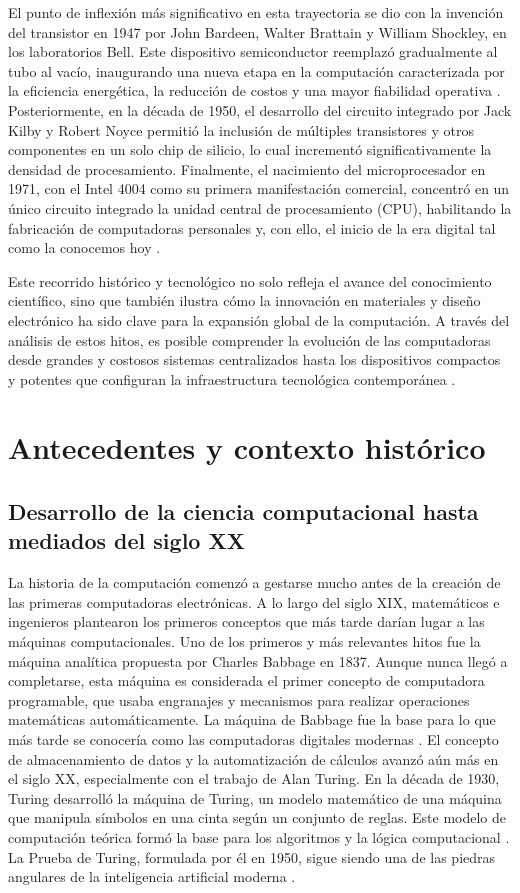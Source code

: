 \documentclass[]{article}
\begin{document}
El punto de inflexión más significativo en esta trayectoria se dio con la invención del transistor en 1947 por John Bardeen, Walter Brattain y William Shockley, en los laboratorios Bell. Este dispositivo semiconductor reemplazó gradualmente al tubo al vacío, inaugurando una nueva etapa en la computación caracterizada por la eficiencia energética, la reducción de costos y una mayor fiabilidad operativa \cite{ceruzzi2003}. Posteriormente, en la década de 1950, el desarrollo del circuito integrado por Jack Kilby y Robert Noyce permitió la inclusión de múltiples transistores y otros componentes en un solo chip de silicio, lo cual incrementó significativamente la densidad de procesamiento. Finalmente, el nacimiento del microprocesador en 1971, con el Intel 4004 como su primera manifestación comercial, concentró en un único circuito integrado la unidad central de procesamiento (CPU), habilitando la fabricación de computadoras personales y, con ello, el inicio de la era digital tal como la conocemos hoy \cite{ceruzzi2003}.

Este recorrido histórico y tecnológico no solo refleja el avance del conocimiento científico, sino que también ilustra cómo la innovación en materiales y diseño electrónico ha sido clave para la expansión global de la computación. A través del análisis de estos hitos, es posible comprender la evolución de las computadoras desde grandes y costosos sistemas centralizados hasta los dispositivos compactos y potentes que configuran la infraestructura tecnológica contemporánea \cite{bowen1993}.

\section{Antecedentes y contexto histórico}
\subsection{Desarrollo de la ciencia computacional hasta mediados del siglo XX} 
La historia de la computación comenzó a gestarse mucho antes de la creación de las primeras computadoras electrónicas. A lo largo del siglo XIX, matemáticos e ingenieros plantearon los primeros conceptos que más tarde darían lugar a las máquinas computacionales. Uno de los primeros y más relevantes hitos fue la máquina analítica propuesta por Charles Babbage en 1837. Aunque nunca llegó a completarse, esta máquina es considerada el primer concepto de computadora programable, que usaba engranajes y mecanismos para realizar operaciones matemáticas automáticamente. La máquina de Babbage fue la base para lo que más tarde se conocería como las computadoras digitales modernas \cite{ceruzzi2003}.
El concepto de almacenamiento de datos y la automatización de cálculos avanzó aún más en el siglo XX, especialmente con el trabajo de Alan Turing. En la década de 1930, Turing desarrolló la máquina de Turing, un modelo matemático de una máquina que manipula símbolos en una cinta según un conjunto de reglas. Este modelo de computación teórica formó la base para los algoritmos y la lógica computacional \cite{turing1936}. La Prueba de Turing, formulada por él en 1950, sigue siendo una de las piedras angulares de la inteligencia artificial moderna \cite{turing1936}.
\end{document}
